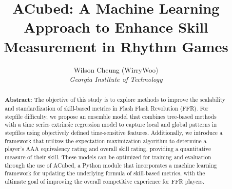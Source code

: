 \documentclass[10pt,a4paper]{scrartcl}
\begin{document}
\title{\Large ACubed: A Machine Learning Approach to Enhance Skill Measurement in Rhythm Games}
\author{\large Wilson Cheung (WirryWoo)\\
\normalsize \textit{Georgia Institute of Technology}}
\date{\vspace{-3ex}}

\maketitle %




\begin{abstract}
	\normalsize
	\textbf{Abstract:} The objective of this study is to explore methods to improve the scalability and standardization of skill-based metrics in Flash Flash Revolution (FFR). For stepfile difficulty, we propose an ensemble model that combines tree-based methods with a time series extrinsic regression model to capture local and global patterns in stepfiles using objectively defined time-sensitive features. Additionally, we introduce a framework that utilizes the expectation-maximization algorithm to determine a player's AAA equivalency rating and overall skill rating, providing a quantitative measure of their skill. These models can be optimized for training and evaluation through the use of ACubed, a Python module that incorporates a machine learning framework for updating the underlying formula of skill-based metrics, with the ultimate goal of improving the overall competitive experience for FFR players.
\end{abstract}

\setcounter{tocdepth}{2}
\tableofcontents


\clearpage








\clearpage




\printbibliography
\end{document}

